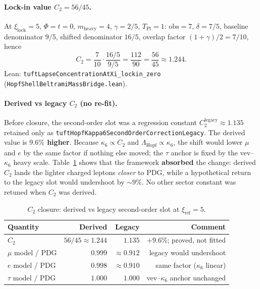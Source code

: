 \documentclass[11pt]{amsart}
\newcommand{\diagnosticrow}{\rowcolor{black!6}}
\begin{document}
\paragraph{Lock-in value $C_2=56/45$.}
At $\xi_{\mathrm{lock}}=5$, $\Phi=t=0$, $m_{\mathrm{heavy}}=4$, $\gamma=2/5$, $T_{\mathrm{Pl}}=1$:
$\mathrm{obs}=7$, $\delta=7/5$, baseline denominator $9/5$, shifted denominator $16/5$, overlap factor $(1+\gamma)/2=7/10$, hence
\[
  C_2 = \frac{7}{10}\cdot\frac{16/5}{9/5}=\frac{112}{90}=\frac{56}{45}\approx 1.244.
\]
Lean: \texttt{tuftLapseConcentrationAtXi\_lockin\_zero} (\texttt{HopfShellBeltramiMassBridge.lean}).

\paragraph{Derived vs legacy $C_2$ (no re-fit).}
Before closure, the second-order slot was a regression constant $C_2^{\mathrm{legacy}}\approx 1.135$ retained only as \texttt{tuftHopfKappa6SecondOrderCorrectionLegacy}. The derived value is \textbf{$9.6\%$ higher}. Because $\kappa_6\propto C_2$ and $\Lambda_{\mathrm{Hopf}}\propto\kappa_6$, the shift would lower $\mu$ and $e$ by the same factor if nothing else moved; the $\tau$ anchor is fixed by the vev--$\kappa_6$ heavy scale. Table~\ref{tab:c2-legacy} shows that the framework \textbf{absorbed} the change: derived $C_2$ lands the lighter charged leptons \emph{closer} to PDG, while a hypothetical return to the legacy slot would undershoot by $\sim 9\%$. No other sector constant was retuned when $C_2$ was derived.

\begin{table}[ht]
  \centering
  \caption{$C_2$ closure: derived vs legacy second-order slot at $\xi_{\mathrm{ref}}=5$.}
  \label{tab:c2-legacy}
  \small
  \begin{tabular}{lrrr}
    \toprule
    Quantity & Derived & Legacy & Comment \\
    \midrule
    $C_2$ & $56/45\approx 1.244$ & $1.135$ & $+9.6\%$; proved, not fitted \\
    \diagnosticrow
    $\mu$ model / PDG & $0.999$ & $\approx 0.912$ & legacy would undershoot \\
    \diagnosticrow
    $e$ model / PDG & $0.998$ & $\approx 0.910$ & same factor ($\kappa_6$ linear) \\
    $\tau$ model / PDG & $1.000$ & $1.000$ & vev--$\kappa_6$ anchor unchanged \\
    \bottomrule
  \end{tabular}
\end{table}
\end{document}
